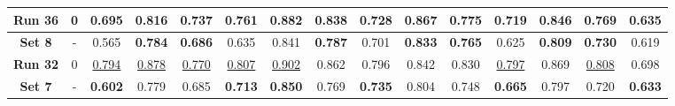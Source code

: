 \begin{table}
{\begin{tabular}{|c|c|ccc|ccc|ccc|c|c|c|c|}
		\textbf{Run 36} & 0 & \multicolumn{1}{c|}{\textbf{0.695}} & \multicolumn{1}{c|}{0.816} & 0.737 & \multicolumn{1}{c|}{0.761} & \multicolumn{1}{c|}{\textbf{0.882}} & 0.838 & \multicolumn{1}{c|}{0.728} & \multicolumn{1}{c|}{0.867} & 0.775 & 0.719 & 0.846 & 0.769 & 0.635 \\
		
		\hline
		
		\textbf{Set 8} & - & \multicolumn{1}{c|}{0.565} & \multicolumn{1}{c|}{\textbf{0.784}} & \textbf{0.686} & \multicolumn{1}{c|}{0.635} & \multicolumn{1}{c|}{0.841} & \textbf{0.787} & \multicolumn{1}{c|}{0.701} & \multicolumn{1}{c|}{\textbf{0.833}} & \textbf{0.765} & 0.625 & \textbf{0.809} & \textbf{0.730} & 0.619 \\
		
		\hline
		\hline
		
		\textbf{Run 32} & 0 & \multicolumn{1}{c|}{\underline{0.794}} & \multicolumn{1}{c|}{\underline{0.878}} & \underline{0.770} & \multicolumn{1}{c|}{\underline{0.807}} & \multicolumn{1}{c|}{\underline{0.902}} & 0.862 & \multicolumn{1}{c|}{0.796} & \multicolumn{1}{c|}{0.842} & 0.830 & \underline{0.797} & 0.869 & \underline{0.808} & 0.698 \\
		
		\hline
		
		\textbf{Set 7} & - & \multicolumn{1}{c|}{\textbf{0.602}} & \multicolumn{1}{c|}{0.779} & 0.685 & \multicolumn{1}{c|}{\textbf{0.713}} & \multicolumn{1}{c|}{\textbf{0.850}} & 0.769 & \multicolumn{1}{c|}{\textbf{0.735}} & \multicolumn{1}{c|}{0.804} & 0.748 & \textbf{0.665} & 0.797 & 0.720 & \textbf{0.633} \\
		
		\hline
			
	\end{tabular}}
	\label{tab:Experiment1.3FourPatches5DegreeRotation}
\end{table}

